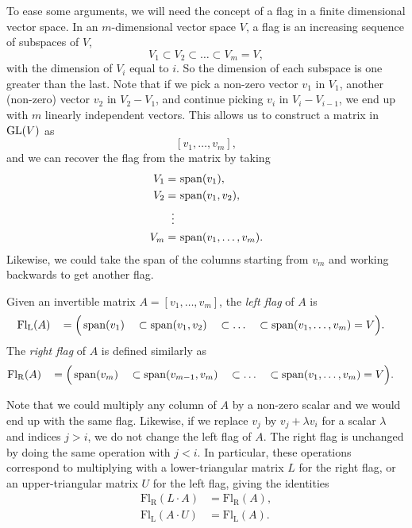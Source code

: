 To ease some arguments, we will need the concept of a flag in a finite
dimensional vector space. In an
$m$-dimensional vector space $V$, a flag is an increasing sequence of
subspaces of $V$,
\[ V_1 \subset V_2 \subset \dots \subset V_m = V, \]
with the dimension of $V_i$ equal to $i$. So the dimension of each
subspace is one greater than the last. Note that if we pick a non-zero
vector $v_1$ in $V_1$, another (non-zero) vector $v_2$ in $V_2 - V_1$,
and continue picking $v_i$ in $V_i - V_{i-1}$, we end up with $m$
linearly independent vectors. This allows us to construct a matrix in
$\operatorname{GL}(V)$ as
\[ [v_1,\dots,v_m], \]
and we can recover the flag from the matrix by taking
\begin{align*}
  V_1 =\, &\operatorname{span}(v_1), \\
  V_2 =\, &\operatorname{span}(v_1,v_2), \\
  \vdots\,\, & \\
  V_m =\, &\operatorname{span}(v_1,\dots,v_m).
\end{align*}
Likewise, we could take the span of the columns starting from $v_m$
and working backwards to get another flag.
\begin{definition}
  Given an invertible matrix $A = [v_1,\dots,v_m]$, the \textit{left
    flag} of $A$ is
  \begin{alignat*}{5}
    \mathrm{Fl_L}(A)\, &&= \Big(&\operatorname{span}(v_1) &&\subset \operatorname{span}(v_1,v_2)
    &&\subset \dots &&\subset \operatorname{span}(v_1,\dots,v_m) = V\Big).
  \end{alignat*}
  The \textit{right flag} of $A$ is defined similarly as
  \begin{alignat*}{5}
    \mathrm{Fl_R}(A)\, &&= \Big(&\operatorname{span}(v_m) &&\subset
    \operatorname{span}(v_{m-1},v_m) &&\subset \dots &&\subset
    \operatorname{span}(v_1,\dots,v_m) = V\Big). 
  \end{alignat*}
\end{definition}
Note that we could multiply any column of $A$ by a non-zero scalar and
we would end up with the same flag. Likewise, if we replace $v_j$ by
$v_j + \lambda v_i$ for a scalar $\lambda$ and indices $j > i$, we do not
change the left flag of $A$. The right flag is unchanged by doing
the same operation with $j < i$. In particular, these operations
correspond to multiplying with a lower-triangular matrix $L$ for the
right flag, or an upper-triangular matrix $U$ for the left flag,
giving the identities
\begin{align*}
  \mathrm{Fl_R}(L\cdot A) &= \mathrm{Fl_R}(A), \\
  \mathrm{Fl_L}(A \cdot U) &= \mathrm{Fl_L}(A).
\end{align*}
